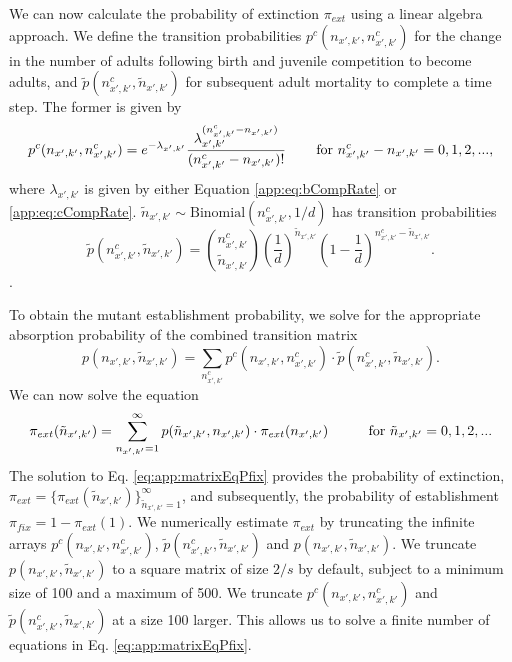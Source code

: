 \documentclass[9pt,twocolumn,twoside,lineno]{gsajnl}
\begin{document}
We can now calculate the probability of extinction $\pi_{ext}$ using a linear algebra approach. We define the transition probabilities $p^{c}(n_{x',k'},n_{x',k'}^c)$ for the change in the number of adults following birth and juvenile competition to become adults, and $\tilde{p}(n_{x',k'}^c,\tilde{n}_{x',k'})$ for subsequent adult mortality to complete a time step. The former is given by
\[
p^{c}(n_{x',k'},n_{x',k'}^c) = e^{-\lambda_{x',k'}}\frac{\lambda_{x',k'}^{(n_{x',k'}^c-n_{x',k'})}}{(n_{x',k'}^c-n_{x',k'})!} \hspace{.3in} \text{for }n_{x',k'}^c-n_{x',k'}=0,1,2,...,
\]
where $\lambda_{x',k'}$ is given by either Equation \eqref{app:eq:bCompRate} or \eqref{app:eq:cCompRate}. $\tilde{n}_{x',k'} \sim \text{Binomial}(n_{x',k'}^c, 1/d)$ has transition probabilities   
\[
\tilde{p}(n_{x',k'}^c,\tilde{n}_{x',k'}) = \binom{n_{x',k'}^c}{\tilde{n}_{x',k'}} \left(\frac{1}{d}\right)^{\tilde{n}_{x',k'}}\left( 1-\frac{1}{d}\right)^{n_{x',k'}^c-\tilde{n}_{x',k'}}.
\].

To obtain the mutant establishment probability, we solve for the appropriate absorption  probability of the combined transition matrix 
\[
p(n_{x',k'},\tilde{n}_{x',k'}) = \sum_{n_{x',k'}^c}p^{c}(n_{x',k'},n_{x',k'}^c) \cdot \tilde{p}(n_{x',k'}^c,\tilde{n}_{x',k'}).
\]
We can now solve the equation
\begin{equation}
\label{eq:app:matrixEqPfix}
\pi_{ext}(\tilde{n}_{x',k'}) = \sum_{n_{x',k'}=1}^\infty  p(\tilde{n}_{x',k'},n_{x',k'}) \cdot \pi_{ext}(n_{x',k'}) \hspace{.4in} \text{for } \tilde{n}_{x',k'}=0,1,2,...
\end{equation}
The solution to Eq. \ref{eq:app:matrixEqPfix} provides the probability of extinction, $\pi_{ext}=\{ \pi_{ext}(\tilde{n}_{x',k'})\}_{\tilde{n}_{x',k'}=1}^\infty$, and subsequently, the probability of establishment $\pi_{fix} = 1-\pi_{ext}(1)$. We numerically estimate $\pi_{ext}$ by truncating the infinite arrays $p^{c}(n_{x',k'},n_{x',k'}^c)$, $\tilde{p}(n_{x',k'}^c,\tilde{n}_{x',k'})$ and $p(n_{x',k'},\tilde{n}_{x',k'})$. We truncate $p(n_{x',k'},\tilde{n}_{x',k'})$ to a square matrix of size $2/s$ by default, subject to a minimum size of 100 and a maximum of 500. We truncate $p^{c}(n_{x',k'},n_{x',k'}^c)$ and $\tilde{p}(n_{x',k'}^c,\tilde{n}_{x',k'})$ at a size 100 larger. This allows us to solve a finite number of equations in Eq. \ref{eq:app:matrixEqPfix}. 
\end{document}
